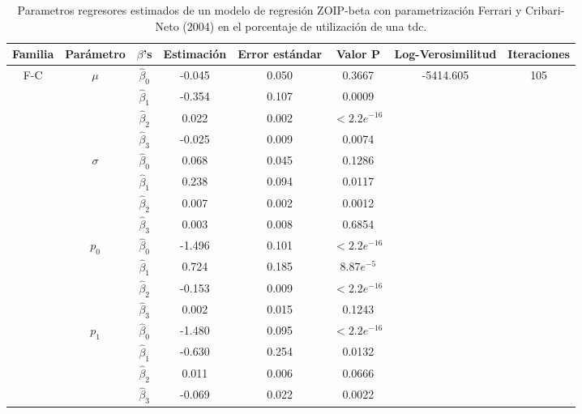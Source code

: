 \begin{table}[!hbt]
{\scriptsize
\begin{center}
\begin{tabular}{|c|c|c|ccc|c|c|}\hline
Familia & Par\'{a}metro & $\beta$'s & Estimaci\'{o}n & Error est\'{a}ndar & Valor P & Log-Verosimilitud & Iteraciones \\ \hline \hline
\multirow{12}{*}{F-C} & \multirow{4}{*}{$\mu$} & $\hat{\beta}_0$ & -0.045	&0.050	&0.3667  & \multirow{12}{*}{-5414.605} & \multirow{12}{*}{105} \\
& & $\hat{\beta}_1$ & -0.354	&0.107	&0.0009   & &\\
& & $\hat{\beta}_2$ & 0.022	&0.002	&$<2.2e^{-16}$   & &\\
& & $\hat{\beta}_3$ & -0.025	&0.009	&0.0074   & &\\ \cline{2-6}
& \multirow{4}{*}{$\sigma$} & $\hat{\beta}_0$ & 0.068	&0.045	&0.1286   & &\\
& & $\hat{\beta}_1$ & 0.238	&0.094	&0.0117   & &\\
& & $\hat{\beta}_2$ & 0.007	&0.002	&0.0012   & &\\
& & $\hat{\beta}_3$ & 0.003	&0.008	&0.6854   & &\\ \cline{2-6}
& \multirow{4}{*}{$p_0$} & $\hat{\beta}_0$ & -1.496	&0.101	&$<2.2e^{-16}$  & &\\
& & $\hat{\beta}_1$ & 0.724	&0.185	&$8.87e^{-5}$  & &\\
& & $\hat{\beta}_2$ & -0.153	&0.009	&$<2.2e^{-16}$  & &\\
& & $\hat{\beta}_3$ & 0.002	&0.015	&0.1243  & &\\ \cline{2-6}
& \multirow{4}{*}{$p_1$} & $\hat{\beta}_0$ &-1.480	&0.095	&$<2.2e^{-16}$  & &\\
& & $\hat{\beta}_1$ & -0.630	&0.254	&0.0132  & &\\
& & $\hat{\beta}_2$ & 0.011	&0.006	&0.0666  & &\\
& & $\hat{\beta}_3$ & -0.069	&0.022	&0.0022  & &\\ \hline

\end{tabular}
\caption{Parametros regresores estimados de un modelo de regresi\'{o}n ZOIP-beta con parametrizaci\'{o}n Ferrari y Cribari-Neto (2004) en el porcentaje de utilizaci\'{o}n de una tdc.}
\label{T_Apli_CC_FC}
\end{center}
}
\end{table}


